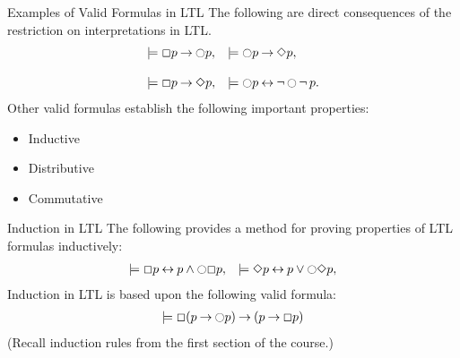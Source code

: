 \documentclass[style=sailor,size=12pt,mode=present]{powerdot}
\theoremstyle{definition}
\newenvironment{thm}[1]
  {\renewcommand\theinnerthm{#1}\innerthm}
  {\endinnerthm}
\begin{document}
\begin{wideslide}[bm=,toc=]{Examples of Valid Formulas in LTL}
The following are direct consequences of the restriction on
interpretations in LTL.
\begin{thm}{13.31}
\[
\begin{array}{ll}
\models \Box p \imp \Circle p, & \models \Circle p \imp \Diamond p,\\ 
~&~ \\
\models \Box p \imp \Diamond p, & \models \Circle p \eqv \ngg \Circle \ngg p. \\
\end{array}
\]
\end{thm}
\vspace{2ex}
Other valid formulas establish the following important properties:
\begin{itemize}
\item Inductive
\item Distributive
\item Commutative
\end{itemize}

\end{wideslide}

\begin{wideslide}[bm=,toc=]{Induction in LTL}
The following provides a method for proving properties of LTL formulas
inductively:\\
\begin{thm}{13.32}
\[
\begin{array}{ll}
\models \Box p \eqv p \land \Circle \Box p, & \models \Diamond p \eqv p \lor \Circle \Diamond p,\\ 
\end{array}
\]
\end{thm}
\vspace{2ex}
Induction in LTL is based upon the following valid formula:
\[
\begin{array}{ll}
\models \Box (p \imp \Circle p) \imp (p \imp \Box p)\\
\end{array}
\]
(Recall induction rules from the first section of the course.)

\end{wideslide}
\end{document}
